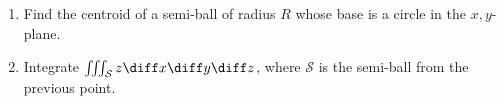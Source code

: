 \begin{enumerate}
\item Find the centroid of a semi-ball of radius $R$ whose base is a circle in the $x,y$-plane.
\item Integrate $\iiint_{\mathcal S} z\diff x\diff y\diff z$, where $\mathcal S$ is the semi-ball from the previous point.
\end{enumerate}